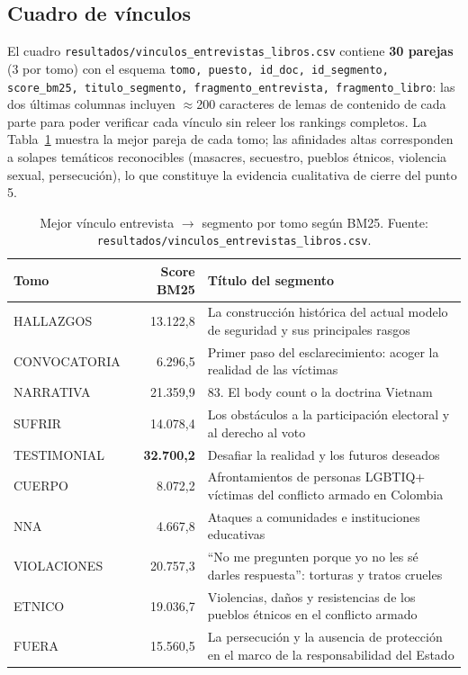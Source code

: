 \documentclass[11pt]{tg_usta}
\begin{document}
\subsection{Cuadro de vínculos}

El cuadro \texttt{resultados/vinculos\_entrevistas\_libros.csv} contiene \textbf{30 parejas} (3 por tomo) con el esquema \texttt{tomo, puesto, id\_doc, id\_segmento, score\_bm25, titulo\_segmento, fragmento\_entrevista, fragmento\_libro}: las dos últimas columnas incluyen $\approx$200 caracteres de lemas de contenido de cada parte para poder verificar cada vínculo sin releer los rankings completos. La Tabla~\ref{tab:vinculos} muestra la mejor pareja de cada tomo; las afinidades altas corresponden a solapes temáticos reconocibles (masacres, secuestro, pueblos étnicos, violencia sexual, persecución), lo que constituye la evidencia cualitativa de cierre del punto 5.

\begin{table}[H]
    \centering
    \caption{Mejor vínculo entrevista $\rightarrow$ segmento por tomo según BM25. Fuente: \texttt{resultados/vinculos\_entrevistas\_libros.csv}.}
    \small
    \setlength{\tabcolsep}{5pt}
    \begin{tabular}{l r p{8.4cm}}
    \toprule
    Tomo & Score BM25 & Título del segmento \\
    \midrule
    HALLAZGOS & 13.122,8 & La construcción histórica del actual modelo de seguridad y sus principales rasgos \\
    CONVOCATORIA & 6.296,5 & Primer paso del esclarecimiento: acoger la realidad de las víctimas \\
    NARRATIVA & 21.359,9 & 83. El body count o la doctrina Vietnam \\
    SUFRIR & 14.078,4 & Los obstáculos a la participación electoral y al derecho al voto \\
    TESTIMONIAL & \textbf{32.700,2} & Desafiar la realidad y los futuros deseados \\
    CUERPO & 8.072,2 & Afrontamientos de personas LGBTIQ+ víctimas del conflicto armado en Colombia \\
    NNA & 4.667,8 & Ataques a comunidades e instituciones educativas \\
    VIOLACIONES & 20.757,3 & ``No me pregunten porque yo no les sé darles respuesta'': torturas y tratos crueles \\
    ETNICO & 19.036,7 & Violencias, daños y resistencias de los pueblos étnicos en el conflicto armado \\
    FUERA & 15.560,5 & La persecución y la ausencia de protección en el marco de la responsabilidad del Estado \\
    \bottomrule
    \end{tabular}
    \label{tab:vinculos}
\end{table}
\end{document}

